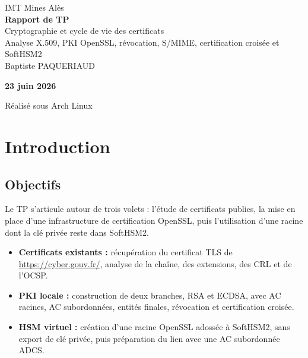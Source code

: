 \documentclass[11pt,a4paper]{article}
\begin{document}
\begin{titlepage}
\vspace*{1.2cm}
\begin{flushleft}
  {\color{white}\Large IMT Mines Alès}\\[0.4cm]
  {\color{white}\Huge\bfseries Rapport de TP}\\[0.35cm]
  {\color{white}\LARGE Cryptographie et cycle de vie des certificats}\\[1.2cm]
  {\color{black}\large Analyse X.509, PKI OpenSSL, révocation, S/MIME, certification croisée et SoftHSM2}\\[0.8cm]
  {\color{black}\Large Baptiste PAQUERIAUD}
\end{flushleft}
\vfill
\begin{flushright}
  \begin{tcolorbox}[colback=white,colframe=lagoon,width=0.62\linewidth,arc=1mm,boxrule=1pt]
  \textbf{23 juin 2026}\par
  Réalisé sous Arch Linux
  \end{tcolorbox}
\end{flushright}
\end{titlepage}

\tableofcontents
\newpage

\section{Introduction}

\subsection{Objectifs}
Le TP s'articule autour de trois volets : l'étude de certificats publics, la mise en place d'une infrastructure de certification OpenSSL, puis l'utilisation d'une racine dont la clé privée reste dans SoftHSM2.

\begin{itemize}[leftmargin=1.4em]
  \item \textbf{Certificats existants :} récupération du certificat TLS de \url{https://cyber.gouv.fr/}, analyse de la chaîne, des extensions, des CRL et de l'OCSP.
  \item \textbf{PKI locale :} construction de deux branches, RSA et ECDSA, avec AC racines, AC subordonnées, entités finales, révocation et certification croisée.
  \item \textbf{HSM virtuel :} création d'une racine OpenSSL adossée à SoftHSM2, sans export de clé privée, puis préparation du lien avec une AC subordonnée ADCS.
\end{itemize}
\end{document}
